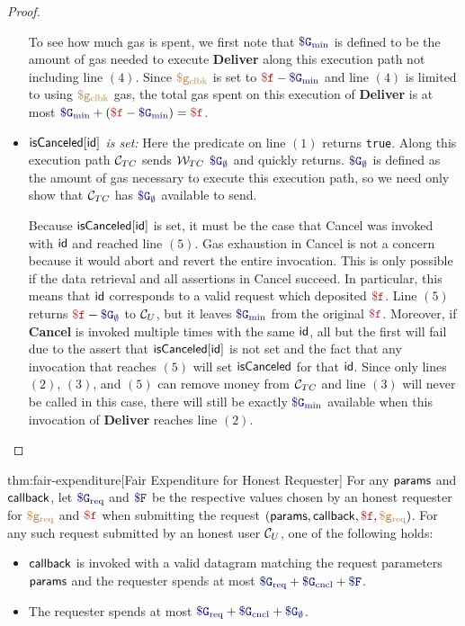 \begin{proof}
\begin{itemize}
To see how much gas is spent, we first note that $\constgasmin$ is defined to be the amount of gas needed to execute {\bf Deliver} along this execution path not including line $(4)$.
Since $\textcolor{brown}{\tt \$g_\text{clbk}}$ is set to $\fee - \constgasmin$ and line $(4)$ is limited to using $\textcolor{brown}{\tt \$g_\text{clbk}}$ gas,
the total gas spent on this execution of {\bf Deliver} is at most $\constgasmin + (\fee - \constgasmin) = \fee$.


\item {\it ${\sf isCanceled}[{\sf id}]$ is set:}
Here the predicate on line $(1)$ returns {\tt true}.
Along this execution path ${\cal C}_{TC}$ sends ${\cal W}_{TC}$ $\constgascancel$ and quickly returns.
$\constgascancel$ is defined as the amount of gas necessary to execute this execution path,
so we need only show that ${\cal C}_{TC}$ has $\constgascancel$ available to send.

Because ${\sf isCanceled}[{\sf id}]$ is set, it must be the case that {\sf Cancel} was invoked with ${\sf id}$ and reached line $(5)$.
Gas exhaustion in {\sf Cancel} is not a concern because it would abort and revert the entire invocation.
This is only possible if the data retrieval and all assertions in {\sf Cancel} succeed.
In particular, this means that ${\sf id}$ corresponds to a valid request which deposited $\fee$.
Line $(5)$ returns $\fee - \constgascancel$ to ${\cal C}_U$, but it leaves $\constgasmin$ from the original $\fee$.
Moreover, if {\bf Cancel} is invoked multiple times with the same ${\sf id}$, all but the first will fail due to the assert that ${\sf isCanceled}[{\sf id}]$ is not set
and the fact that any invocation that reaches $(5)$ will set ${\sf isCanceled}$ for that ${\sf id}$.
Since only lines $(2)$, $(3)$, and $(5)$ can remove money from ${\cal C}_{TC}$ and line $(3)$ will never be called in this case,
there will still be exactly $\constgasmin$ available when this invocation of {\bf Deliver} reaches line $(2)$.

\end{itemize}
\end{proof}






\begin{retheorem}{thm:fair-expenditure}[Fair Expenditure for Honest Requester]
For any ${\sf params}$ and ${\sf callback}$,
let $\constgasrequest$ and $\consthonestfee$ be the respective values chosen by an honest requester for $\textcolor{brown}{\tt \$g_\text{req}}$ and $\fee$
when submitting the request $(\dgform, \dgcallback, \fee, \gasrequest)$.
For any such request submitted by an honest user ${\cal C}_U$, one of the following holds:
\begin{itemize}
  \setlength{\itemsep}{2pt}
  \setlength{\parskip}{0pt}
  \setlength{\parsep}{0pt}
  \item ${\sf callback}$ is invoked with a valid datagram matching the request parameters ${\sf params}$
    and the requester spends at most $\constgasrequest + \constgasinvokecancel + \consthonestfee$.

  \item The requester spends at most $\constgasrequest + \constgasinvokecancel + \constgascancel$.
\end{itemize}
\end{retheorem}



